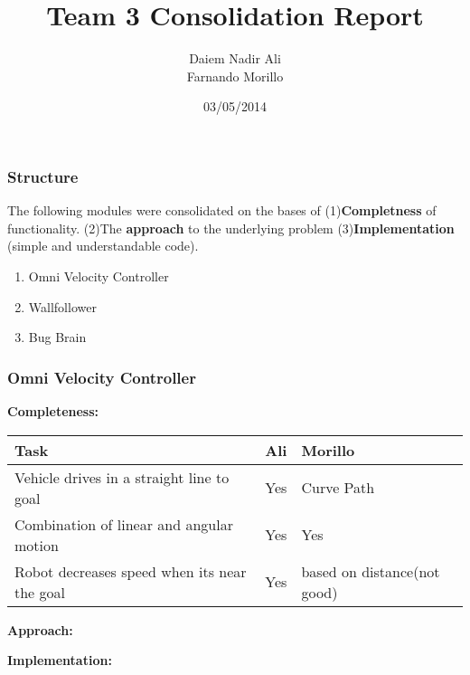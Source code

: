 \documentclass{beamer}
\title{Team 3 Consolidation Report} %
\author{Daiem Nadir Ali \\ Farnando Morillo } %
\institute[HBRS] %
{
Hochschule Bonn-Rhein-Sieg \\ %
\medskip
}
\date{03/05/2014} %
\begin{document}
\begin{frame}
\titlepage %
\end{frame}

\begin{frame}
  \frametitle{Structure}
  The following modules were consolidated on the bases of 
  (1)\textbf{Completness} of functionality.
  (2)The \textbf{approach} to the underlying problem 
  (3)\textbf{Implementation} (simple and understandable code).\\


  \begin{enumerate}
    \item Omni Velocity Controller
    \item Wallfollower
    \item Bug Brain
  \end{enumerate}
\end{frame}

\begin{frame}
  \frametitle{Omni Velocity Controller}


 \textbf{Completeness:}
    \begin{center}
      \begin{tabular}{| p{4cm} | p{2.7cm} | p{2.7cm} | }
      \hline
	\textbf{Task}  & \textbf{Ali} & \textbf{Morillo}\\ \hline
	Vehicle drives in a straight line to goal & Yes & Curve Path\\  \hline
	Combination of linear and angular motion & Yes & Yes\\  \hline
	Robot decreases speed when its near the goal & Yes & based on distance(not good)\\  \hline
      \end{tabular}
  \end{center}
  \textbf{Approach:}
  \begin{center}
  \end{center}
  
  \textbf{Implementation:}
  \begin{center}
  \end{center}
\end{frame}
\end{document}
